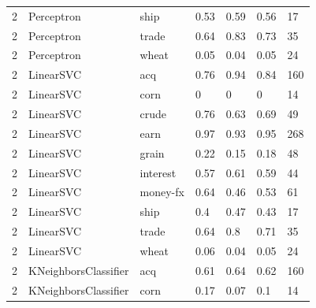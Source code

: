\documentclass{article}
\begin{document}
\begin{table}[h]
\begin{tabular}{lllllll}
2             & Perceptron             & ship            & 0.53               & 0.59            & 0.56              & 17               \\
2             & Perceptron             & trade           & 0.64               & 0.83            & 0.73              & 35               \\
2             & Perceptron             & wheat           & 0.05               & 0.04            & 0.05              & 24               \\
2             & LinearSVC              & acq             & 0.76               & 0.94            & 0.84              & 160              \\
2             & LinearSVC              & corn            & 0                  & 0               & 0                 & 14               \\
2             & LinearSVC              & crude           & 0.76               & 0.63            & 0.69              & 49               \\
2             & LinearSVC              & earn            & 0.97               & 0.93            & 0.95              & 268              \\
2             & LinearSVC              & grain           & 0.22               & 0.15            & 0.18              & 48               \\
2             & LinearSVC              & interest        & 0.57               & 0.61            & 0.59              & 44               \\
2             & LinearSVC              & money-fx        & 0.64               & 0.46            & 0.53              & 61               \\
2             & LinearSVC              & ship            & 0.4                & 0.47            & 0.43              & 17               \\
2             & LinearSVC              & trade           & 0.64               & 0.8             & 0.71              & 35               \\
2             & LinearSVC              & wheat           & 0.06               & 0.04            & 0.05              & 24               \\
2             & KNeighborsClassifier   & acq             & 0.61               & 0.64            & 0.62              & 160              \\
2             & KNeighborsClassifier   & corn            & 0.17               & 0.07            & 0.1               & 14               \\

\end{tabular}
\end{table}
\end{document}
